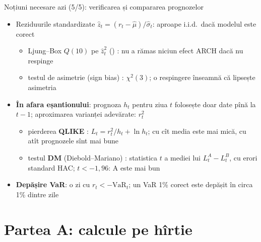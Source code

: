 \begin{frame}{Noțiuni necesare azi (5/5): verificarea și compararea prognozelor}
\itemsize{\small}
\begin{itemize}
    \item Reziduurile standardizate $\hat z_t = (r_t - \hat\mu)/\hat\sigma_t$: aproape i.i.d.\ dacă modelul este corect
    \begin{itemize}
        \item Ljung--Box $Q(10)$ pe $\hat z_t^2$ () : nu a rămas niciun efect ARCH dacă nu respinge
        \item testul de asimetrie (sign bias) : $\chi^2(3)$; o respingere înseamnă că lipsește asimetria
    \end{itemize}
    \item \textbf{În afara eșantionului}: prognoza $h_t$ pentru ziua $t$ folosește doar date pînă la $t-1$; aproximarea varianței adevărate: $r_t^2$
    \begin{itemize}
        \item pierderea \textbf{QLIKE} : $L_t = r_t^2/h_t + \ln h_t$; cu cît media este mai mică, cu atît prognozele sînt mai bune
        \item testul \textbf{DM} (Diebold--Mariano) : statistica $t$ a mediei lui $L_t^A - L_t^B$, cu erori standard HAC; $t < -1{,}96$: A este mai bun
    \end{itemize}
    \item \textbf{Depășire VaR}: o zi cu $r_t < -\mathrm{VaR}_t$; un VaR 1\% corect este depășit în circa 1\% dintre zile
\end{itemize}
\end{frame}


\section{Partea A: calcule pe hîrtie}

